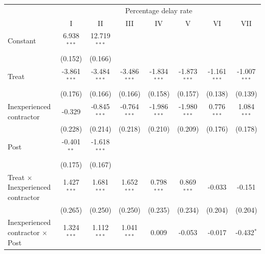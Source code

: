 \documentclass[
]{article}
\begin{document}
\begin{tabular}{lccccccc}
   \toprule
    & \multicolumn{7}{c}{Percentage delay rate}\\
                                                           & I              & II             & III            & IV             & V              & VI             & VII\\  
   Constant                                                & 6.938$^{***}$  & 12.719$^{***}$ &                &                &                &                &   \\   
                                                           & (0.152)        & (0.166)        &                &                &                &                &   \\   
   Treat                                                   & -3.861$^{***}$ & -3.484$^{***}$ & -3.486$^{***}$ & -1.834$^{***}$ & -1.873$^{***}$ & -1.161$^{***}$ & -1.007$^{***}$\\   
                                                           & (0.176)        & (0.166)        & (0.166)        & (0.158)        & (0.157)        & (0.138)        & (0.139)\\   
   Inexperienced contractor                                & -0.329         & -0.845$^{***}$ & -0.764$^{***}$ & -1.986$^{***}$ & -1.980$^{***}$ & 0.776$^{***}$  & 1.084$^{***}$\\   
                                                           & (0.228)        & (0.214)        & (0.218)        & (0.210)        & (0.209)        & (0.176)        & (0.178)\\   
   Post                                                    & -0.401$^{**}$  & -1.618$^{***}$ &                &                &                &                &   \\   
                                                           & (0.175)        & (0.167)        &                &                &                &                &   \\   
   Treat $\times$ Inexperienced contractor                 & 1.427$^{***}$  & 1.681$^{***}$  & 1.652$^{***}$  & 0.798$^{***}$  & 0.869$^{***}$  & -0.033         & -0.151\\   
                                                           & (0.265)        & (0.250)        & (0.250)        & (0.235)        & (0.234)        & (0.204)        & (0.204)\\   
   Inexperienced contractor $\times$ Post                  & 1.324$^{***}$  & 1.112$^{***}$  & 1.041$^{***}$  & 0.009          & -0.053         & -0.017         & -0.432$^{*}$\\   

\end{tabular}
\end{document}
